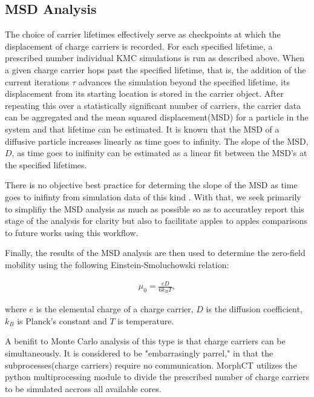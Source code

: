 \subsection{MSD Analysis}

The choice of carrier lifetimes effectively serve as checkpoints at which the displacement of charge carriers is recorded. For
each specified lifetime, a prescribed number individual KMC simulations is run as described above. When a
given charge carrier hops past the specified lifetime, that is, the addition of the current iterations $\tau$ advances
the simulation beyond the specified lifetime,  its displacement from its starting location is stored in the carrier object. After repeating this over a
statistically significant number of carriers, the carrier data can be aggregated and the mean squared
displacement(MSD) for a particle in the system and that lifetime can be estimated.
It is known that the MSD of a diffusive particle increases linearly as time goes to infinity. 
The slope of the MSD, $D$,  as time
goes to inifinity can be estimated as a linear fit between the MSD's at the specified lifetimes.

There is no objective best practice for determing the slope of the MSD as
time goes to inifinty from simulation data of this kind \cite{Maginn2018}. With that, we seek primarily to simplifiy the MSD analysis as much as
possible so as to accuratley report this stage of the analysis for clarity but also to facilitate apples to
apples comparisons to future works using this workflow. 

Finally, the results of the MSD analysis are then used to determine the zero-field mobility using the following Einstein-Smoluchowski relation:

\begin{align}
    \mu_{0} = \frac{eD}{6k_{B}T},
\end{align}

where $e$ is the elemental charge of a charge carrier, $D$ is the diffusion coefficient, $k_{B}$ is Planck's
constant and $T$ is temperature.  

A benifit to Monte Carlo analysis of this type is that charge carriers can be simultaneously. It is considered
to be "embarrasingly parrel," in that the subprocesses(charge carriers) require no communication.
MorphCT utilizes the python multiprocessing module to divide the prescribed number of charge carriers to be
simulated accross all available cores.  

